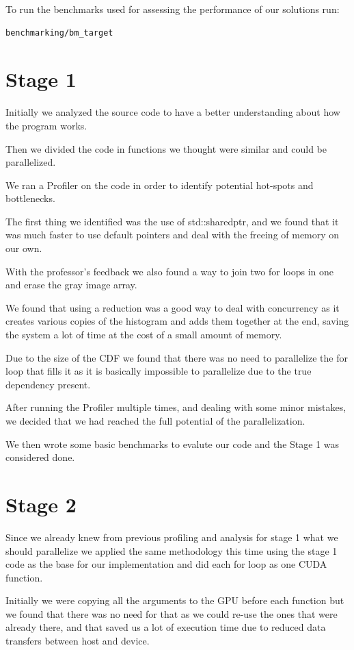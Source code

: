 \documentclass[sigconf]{acmart}
\begin{document}
    To run the benchmarks used for assessing the performance of our solutions run:

    \begin{lstlisting}
benchmarking/bm_target
    \end{lstlisting}

    \section{Stage 1}
    Initially we analyzed the source code to have a better understanding about how the program works.

    Then we divided the code in functions we thought were similar and could be parallelized.

    We ran a Profiler on the code in order to identify potential hot-spots and bottlenecks.

    The first thing we identified was the use of std::sharedptr, and we found that it was much faster to use default pointers and deal with the freeing of memory on our own.

    With the professor's feedback we also found a way to join two for loops in one and erase the gray image array.

    We found that using a reduction was a good way to deal with concurrency as it creates various copies of the histogram and adds them together at the end, saving the system a lot of time at the cost of a small amount of memory.

    Due to the size of the CDF we found that there was no need to parallelize the for loop that fills it as it is basically impossible to parallelize due to the true dependency present.

    After running the Profiler multiple times, and dealing with some minor mistakes, we decided that we had reached the full potential of the parallelization.

    We then wrote some basic benchmarks to evalute our code and the Stage 1 was considered done.


    \section{Stage 2}
    Since we already knew from previous profiling and analysis for stage 1 what we should parallelize we applied the same methodology this time using the stage 1 code as the base for our implementation and did each for loop as one CUDA function.

    Initially we were copying all the arguments to the GPU before each function but we found that there was no need for that as we could re-use the ones that were already there, and that saved us a lot of execution time due to reduced data transfers between host and device.
\end{document}
